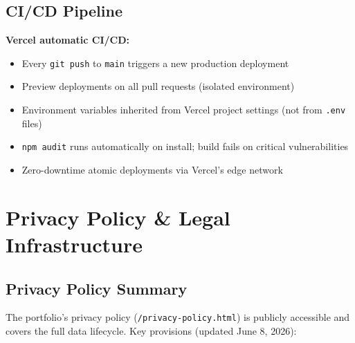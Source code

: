 \documentclass[12pt, a4paper]{article}
\begin{document}
\subsection{CI/CD Pipeline}

\begin{purplebox}
\textbf{Vercel automatic CI/CD:}
\begin{itemize}[noitemsep]
  \item Every \texttt{git push} to \texttt{main} triggers a new production deployment
  \item Preview deployments on all pull requests (isolated environment)
  \item Environment variables inherited from Vercel project settings (not from \texttt{.env} files)
  \item \texttt{npm audit} runs automatically on install; build fails on critical vulnerabilities
  \item Zero-downtime atomic deployments via Vercel's edge network
\end{itemize}
\end{purplebox}

\section{Privacy Policy \& Legal Infrastructure}
\label{sec:privacy}

\subsection{Privacy Policy Summary}

The portfolio's privacy policy (\texttt{/privacy-policy.html}) is publicly accessible
and covers the full data lifecycle. Key provisions (updated June 8, 2026):
\end{document}
